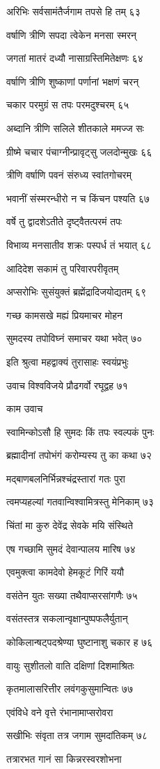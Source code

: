 अरिभिः सर्वसामंतैर्जगाम तपसे हि तम् ६३

वर्षाणि त्रीणि सपदा त्वेकेन मनसा स्मरन्

जगतां मातरं दध्यौ नासाग्रस्तिमितेक्षणः ६४

वर्षाणि त्रीणि शुष्काणां पर्णानां भक्षणं चरन्

चकार परमुग्रं स तपः परमदुश्चरम् ६५

अब्दानि त्रीणि सलिले शीतकाले ममज्ज सः

ग्रीष्मे चचार पंचाग्नीन्प्रावृट्सु जलदोन्मुखः ६६

त्रीणि वर्षाणि पवनं संरुध्य स्वांतगोचरम्

भवानीं संस्मरन्धीरो न च किंचन पश्यति ६७

वर्षे तु द्वादशेऽतीते दृष्ट्वैतत्परमं तपः

विभाव्य मनसातीव शक्रः पस्पर्ध तं भयात् ६८

आदिदेश सकामं तु परिवारपरीवृतम्

अप्सरोभिः सुसंयुक्तं ब्रह्मेंद्रादिजयोद्यतम् ६९

गच्छ कामसखे मह्यं प्रियमाचर मोहन

सुमदस्य तपोविघ्नं समाचर यथा भवेत् ७०

इति श्रुत्वा महद्वाक्यं तुरासाहः स्वयंप्रभुः

उवाच विश्वविजये प्रौढगर्वो रघूद्वह ७१

काम उवाच

स्वामिन्कोऽसौ हि सुमदः किं तपः स्वल्पकं पुनः

ब्रह्मादीनां तपोभंगं करोम्यस्य तु का कथा ७२

मद्बाणबलनिर्भिन्नश्चंद्रस्तारां गतः पुरा

त्वमप्यहल्यां गतवान्विश्वामित्रस्तु मेनिकाम् ७३

चिंतां मा कुरु देवेंद्र सेवके मयि संस्थिते

एष गच्छामि सुमदं देवान्पालय मारिष ७४

एवमुक्त्वा कामदेवो हेमकूटं गिरिं ययौ

वसंतेन युतः सख्या तथैवाप्सरसांगणैः ७५

वसंतस्तत्र सकलान्वृक्षान्पुष्पफलैर्युतान्

कोकिलान्षट्पदश्रेण्या घुष्टानाशु चकार ह ७६

वायुः सुशीतलो वाति दक्षिणां दिशमाश्रितः

कृतमालासरित्तीर लवंगकुसुमान्वितः ७७

एवंविधे वने वृत्ते रंभानामाप्सरोवरा

सखीभिः संवृता तत्र जगाम सुमदांतिकम् ७८

तत्रारभत गानं सा किन्नरस्वरशोभना

